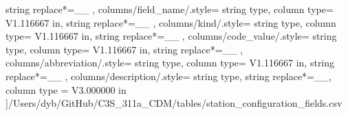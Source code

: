\begin{landscape}
{            string replace*={_}{\_}
        },
    columns/field_name/.style={
            string type, 
            column type= V{1.116667 in}, 
            string replace*={_}{\_}
        },
    columns/kind/.style={
            string type, 
            column type= V{1.116667 in}, 
            string replace*={_}{\_}
        },
    columns/code_value/.style={
            string type, 
            column type= V{1.116667 in}, 
            string replace*={_}{\_}
        },
    columns/abbreviation/.style={
            string type, 
            column type= V{1.116667 in}, 
            string replace*={_}{\_}
        },
    columns/description/.style={
            string type, 
            string replace*={_}{\_},
            column type = V{3.000000 in}
        }
    ]{/Users/dyb/GitHub/C3S_311a_CDM/tables/station_configuration_fields.csv}
\end{landscape}
